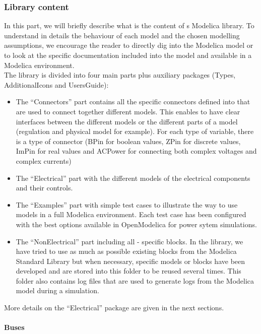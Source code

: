 \documentclass[a4paper, 12pt]{report}
\begin{document}
\subsubsection{Library content}

In this part, we will briefly describe what is the content of \Dynawo\textquotesingle s Modelica library. To understand in details the behaviour of each model and the chosen modelling assumptions, we encourage the reader to directly dig into the Modelica  model or to look at the specific documentation included into the model and available in a Modelica environment.\\

The \Dynawo library is divided into four main parts plus auxiliary packages (Types, AdditionalIcons and UsersGuide):
\begin{itemize}
\item The ``Connectors'' part contains all the specific connectors defined into \Dynawo that are used to connect together different models. This enables to have clear interfaces between the different models or the different parts of a model (regulation and physical model for example). For each type of variable, there is a type of connector (BPin for boolean values, ZPin for discrete values, ImPin for real values and ACPower for connecting both complex voltages and complex currents)
\item The ``Electrical'' part with the different models of the electrical components and their controls.
\item The ``Examples'' part with simple test cases to illustrate the way to use \Dynawo models in a full Modelica environment. Each test case has been configured with the best options available in OpenModelica for power sytem simulations.
\item The ``NonElectrical'' part including all \Dynawo - specific blocks. In the library, we have tried to use as much as possible existing blocks from the Modelica Standard Library but when necessary, specific models or blocks have been developed and are stored into this folder to be reused several times. This folder also contains log files that are used to generate logs from the Modelica model during a simulation.
\end{itemize}

More details on the ``Electrical'' package are given in the next sections.

\paragraph{Buses}
~~\\
\end{document}
